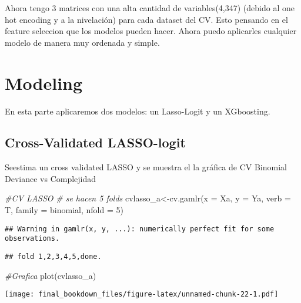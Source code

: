 \documentclass[
]{book}
\newenvironment{Shaded}{\begin{snugshade}}{\end{snugshade}}
\newcommand{\AttributeTok}[1]{\textcolor[rgb]{0.77,0.63,0.00}{#1}}
\newcommand{\CommentTok}[1]{\textcolor[rgb]{0.56,0.35,0.01}{\textit{#1}}}
\newcommand{\DecValTok}[1]{\textcolor[rgb]{0.00,0.00,0.81}{#1}}
\newcommand{\FunctionTok}[1]{\textcolor[rgb]{0.00,0.00,0.00}{#1}}
\newcommand{\NormalTok}[1]{#1}
\newcommand{\OtherTok}[1]{\textcolor[rgb]{0.56,0.35,0.01}{#1}}
\newcommand{\StringTok}[1]{\textcolor[rgb]{0.31,0.60,0.02}{#1}}
\begin{document}
Ahora tengo 3 matrices con una alta cantidad de variables(4,347) (debido al one hot encoding y a la nivelación) para cada dataset del CV. Esto pensando en el feature seleccion que los modelos pueden hacer. Ahora puedo aplicarles cualquier modelo de manera muy ordenada y simple.

\hypertarget{modeling}{%
\chapter{Modeling}\label{modeling}}

En esta parte aplicaremos dos modelos: un Lasso-Logit y un XGboosting.

\hypertarget{cross-validated-lasso-logit}{%
\section{Cross-Validated LASSO-logit}\label{cross-validated-lasso-logit}}

Seestima un cross validated LASSO y se muestra el la gráfica de CV Binomial Deviance vs Complejidad

\begin{Shaded}
\begin{Highlighting}[]
\CommentTok{\#CV LASSO}
\CommentTok{\# se hacen 5 folds }
\NormalTok{cvlasso\_a}\OtherTok{\textless{}{-}}\FunctionTok{cv.gamlr}\NormalTok{(}\AttributeTok{x =}\NormalTok{ Xa, }\AttributeTok{y =}\NormalTok{ Ya, }\AttributeTok{verb =}\NormalTok{ T, }\AttributeTok{family =} \StringTok{\textquotesingle{}binomial\textquotesingle{}}\NormalTok{, }\AttributeTok{nfold =} \DecValTok{5}\NormalTok{)}
\end{Highlighting}
\end{Shaded}

\begin{verbatim}
## Warning in gamlr(x, y, ...): numerically perfect fit for some observations.
\end{verbatim}

\begin{verbatim}
## fold 1,2,3,4,5,done.
\end{verbatim}

\begin{Shaded}
\begin{Highlighting}[]
\CommentTok{\#Grafica}
\FunctionTok{plot}\NormalTok{(cvlasso\_a)}
\end{Highlighting}
\end{Shaded}

\texttt{[image: final\_bookdown\_files/figure-latex/unnamed-chunk-22-1.pdf]}
\end{document}
